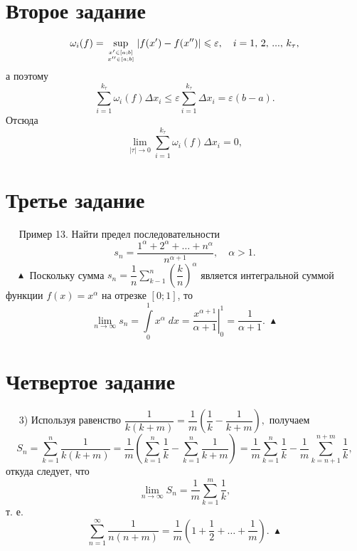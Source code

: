 \documentclass[a4paper,12pt]{article} %
\begin{document}
	\section{Второе задание}
	$$
		\omega_i(f) = \sup \limits_{x' \in \left[a ; b\right] \atop x'' \in \left[a ; b\right]} |f(x') -f(x'')| \leqslant \varepsilon, \quad
		i=1,\, 2, \, ... , \, k_\tau,
	$$
	а поэтому
	$$
		\sum \limits_{i=1}^{k_\tau} \omega_i(f) \Delta x_i \leqslant \varepsilon 
		\sum \limits_{i=1}^{k_\tau} \Delta x_i = 
		\varepsilon \left(b - a\right).
	$$
	Отсюда
	$$
		\lim \limits_{| \tau | \to 0} \sum \limits_{i=1}^{k_\tau} \omega_i(f) \Delta x_i = 0,
	$$
	
	\section{Третье задание}
	$\quad$ Пример 13. Найти предел последовательности 
	$$
		s_n = \dfrac{1^{\alpha} + 2^{\alpha} + \dots + n^{\alpha}}{n^{\alpha + 1}}, \quad \alpha > 1.
	$$
	$\quad \blacktriangle$ Поскольку сумма $s_n \! = \dfrac{1}{n} \displaystyle \sum \limits_{k-1}^n \left( \dfrac{k}{n} \right)^ \alpha$ является интегральной суммой функции
	$f(x) = x^{\alpha}$ на отрезке $\left[0; 1\right]$, то
	$$
		\lim \limits_{n \to \infty} s_n = 
		\int \limits_0^1 x^{\alpha} \; dx = 
		\left. \dfrac{x^{\alpha + 1}}{\alpha + 1} \right|_0^1 =
		\dfrac{1}{\alpha + 1}. \; \blacktriangle
	$$
	
	\section{Четвертое задание}
	$\quad$ 3) Используя равенство
	$
		\dfrac{1}{k \left(k + m\right)} = \dfrac{1}{m}
		\left( \dfrac{1}{k} - \dfrac{1}{k + m} \right) \! ,
	$
	получаем
	$$
		S_n = \sum \limits_{k = 1}^n \dfrac{1}{k \left(k + m\right)} = 
		\dfrac{1}{m} \left( \sum \limits_{k=1}^n \dfrac{1}{k} - \sum \limits_{k=1}^n \dfrac{1}{k + m} \right) = 
		\dfrac{1}{m} \sum \limits_{k = 1}^n \dfrac{1}{k} -
		\dfrac{1}{m} \sum \limits_{k = n + 1}^{n + m} \dfrac{1}{k},
	$$
	откуда следует, что
	$$
		\lim \limits_{n \to \infty} S_n = \dfrac{1}{m} \sum \limits_{k=1}^m \dfrac{1}{k},
	$$
	т. е.
	$$
		\sum \limits_{n = 1}^{\infty} \dfrac{1}{n \left(n + m\right)} =
		\dfrac{1}{m} \left(1 + \dfrac{1}{2} + \dots + \dfrac{1}{m} \right) \! . \; \blacktriangle
	$$
	
\end{document}
